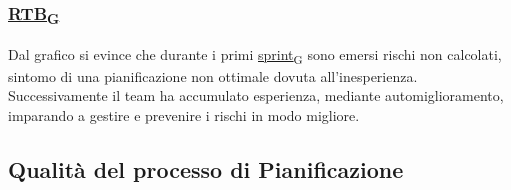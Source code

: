\subsubsection*{\href{https://7last.github.io/docs/rtb/documentazione-interna/glossario\#requirements-and-technology-baseline}{RTB\textsubscript{G}}}
Dal grafico si evince che durante i primi \href{https://7last.github.io/docs/rtb/documentazione-interna/glossario\#sprint}{sprint\textsubscript{G}} sono emersi rischi non calcolati, sintomo di una pianificazione non ottimale dovuta all'inesperienza. Successivamente il team ha accumulato esperienza, mediante automiglioramento, imparando a gestire e prevenire i rischi in modo migliore. 

\newpage
\subsection{Qualità del processo di Pianificazione}
